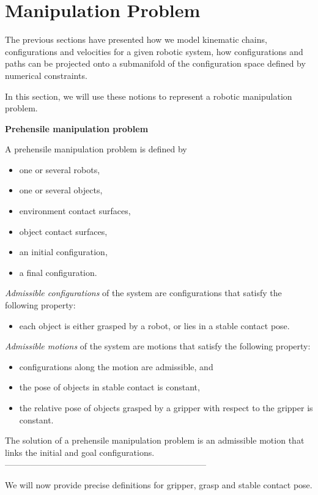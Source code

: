 \section{Manipulation Problem}\label{sec:manipulation-problem}

The previous sections have presented how we model kinematic chains, configurations and velocities for a given robotic system, how configurations and paths can be projected onto a submanifold of the configuration space defined by numerical constraints.

In this section, we will use these notions to represent a robotic manipulation problem.

\begin{definition}\label{def:manipulation-problem}\textbf{Prehensile manipulation problem}
  
  \noindent A prehensile manipulation problem is defined by
  \begin{itemize}
  \item one or several robots,
  \item one or several objects,
  \item environment contact surfaces,
  \item object contact surfaces,
  \item an initial configuration,
  \item a final configuration.
  \end{itemize}
  \textit{Admissible configurations} of the system are configurations that satisfy the following property:
  \begin{itemize}
    \item each object is either grasped by a robot, or lies in a stable contact pose.
  \end{itemize}
  \textit{Admissible motions} of the system are motions that satisfy the following property:
  \begin{itemize}
  \item configurations along the motion are admissible, and
  \item the pose of objects in stable contact is constant,
  \item the relative pose of objects grasped by a gripper with respect to the gripper is constant.
  \end{itemize}
  The solution of a prehensile manipulation problem is an admissible motion that
  links the initial and goal configurations.\\
  -----------------------------------------------------------------------
\end{definition}
We will now provide precise definitions for gripper, grasp and stable contact pose.


